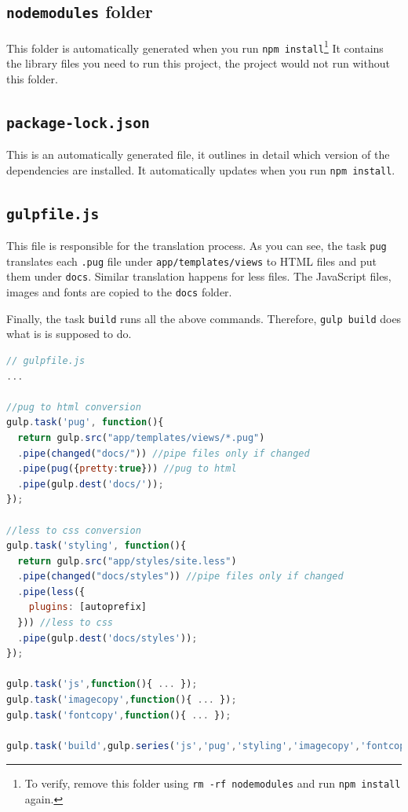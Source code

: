 \subsection{\texttt{node\textunderscore modules} folder}

This folder is automatically generated when you run \texttt{npm install}\footnote{To verify, remove this folder using \texttt{rm -rf node\textunderscore modules} and run \texttt{npm install} again.} It contains the library files you need to run this project, the project would not run without this folder. 

\subsection{\texttt{package-lock.json}}

This is an automatically generated file, it outlines in detail which version of the dependencies are installed. It automatically updates when you run \texttt{npm install}.

\subsection{\texttt{gulpfile.js}}
\label{sec:gulpfile}

This file is responsible for the translation process. As you can see, the task \texttt{pug} translates each \texttt{.pug} file under \texttt{app/templates/views} to HTML files and put them under \texttt{docs}. Similar translation happens for less files. The JavaScript files, images and fonts are copied to the \texttt{docs} folder.

Finally, the task \texttt{build} runs all the above commands. Therefore, \texttt{gulp build} does what is is supposed to do. 

\begin{lstlisting}[language=JavaScript]
// gulpfile.js
...

//pug to html conversion
gulp.task('pug', function(){
  return gulp.src("app/templates/views/*.pug")
  .pipe(changed("docs/")) //pipe files only if changed 
  .pipe(pug({pretty:true})) //pug to html
  .pipe(gulp.dest('docs/'));
});

//less to css conversion
gulp.task('styling', function(){
  return gulp.src("app/styles/site.less")
  .pipe(changed("docs/styles")) //pipe files only if changed 
  .pipe(less({
    plugins: [autoprefix]
  })) //less to css
  .pipe(gulp.dest('docs/styles'));
});

gulp.task('js',function(){ ... });
gulp.task('imagecopy',function(){ ... });
gulp.task('fontcopy',function(){ ... });

gulp.task('build',gulp.series('js','pug','styling','imagecopy','fontcopy'));

\end{lstlisting}

